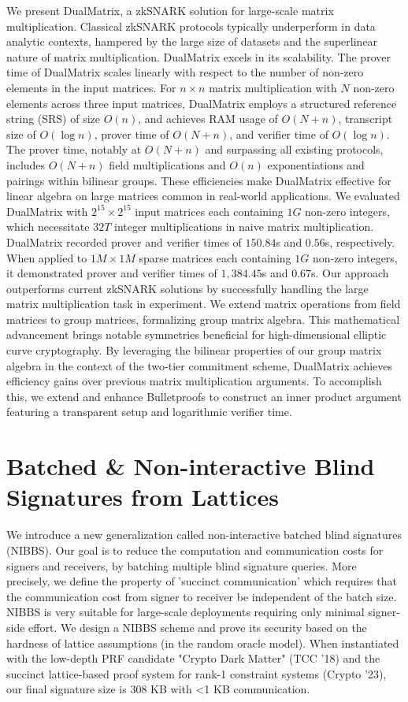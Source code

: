 \documentclass[11pt,oneside]{book}
\theoremstyle{definition}
\theoremstyle{remark}
\theoremstyle{plain}
\begin{document}
We present DualMatrix, a zkSNARK solution for large-scale matrix multiplication. Classical zkSNARK protocols typically underperform in data analytic contexts, hampered by the large size of datasets and the superlinear nature of matrix multiplication. DualMatrix excels in its scalability. The prover time of DualMatrix scales linearly with respect to the number of non-zero elements in the input matrices. For $n \times n$ matrix multiplication with $N$ non-zero elements across three input matrices, DualMatrix employs a structured reference string (SRS) of size $O(n)$, and achieves RAM usage of $O(N+n)$, transcript size of $O(\log n)$, prover time of $O(N+n)$, and verifier time of $O(\log n)$. The prover time, notably at $O(N+n)$ and surpassing all existing protocols, includes $O(N+n)$ field multiplications and $O(n)$ exponentiations and pairings within bilinear groups. These efficiencies make DualMatrix effective for linear algebra on large matrices common in real-world applications. We evaluated DualMatrix with $2^{15} \times 2^{15}$ input matrices each containing $1G$ non-zero integers, which necessitate $32T$ integer multiplications in naive matrix multiplication. DualMatrix recorded prover and verifier times of $150.84$s and $0.56$s, respectively. When applied to $1M \times 1M$ sparse matrices each containing $1G$ non-zero integers, it demonstrated prover and verifier times of $1,384.45$s and $0.67$s. Our approach outperforms current zkSNARK solutions by successfully handling the large matrix multiplication task in experiment. We extend matrix operations from field matrices to group matrices, formalizing group matrix algebra. This mathematical advancement brings notable symmetries beneficial for high-dimensional elliptic curve cryptography. By leveraging the bilinear properties of our group matrix algebra in the context of the two-tier commitment scheme, DualMatrix achieves efficiency gains over previous matrix multiplication arguments. To accomplish this, we extend and enhance Bulletproofs to construct an inner product argument featuring a transparent setup and logarithmic verifier time.

\section{\cite{cryptoeprint:2025/1771} Batched \& Non-interactive Blind Signatures from Lattices}

We introduce a new generalization called non-interactive batched blind signatures (NIBBS). Our goal is to reduce the computation and communication costs for signers and receivers, by batching multiple blind signature queries. More precisely, we define the property of 'succinct communication' which requires that the communication cost from signer to receiver be independent of the batch size. NIBBS is very suitable for large-scale deployments requiring only minimal signer-side effort. We design a NIBBS scheme and prove its security based on the hardness of lattice assumptions (in the random oracle model). When instantiated with the low-depth PRF candidate "Crypto Dark Matter" (TCC '18) and the succinct lattice-based proof system for rank-1 constraint systems (Crypto '23), our final signature size is 308 KB with <1 KB communication.
\end{document}
